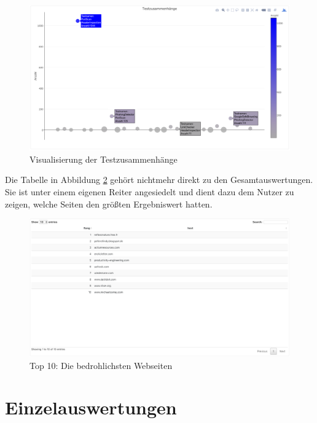 \begin{figure}[H]
  \centering
  \includegraphics[width=15cm]{images/stats/testzusammenhaenge}
  \caption{Visualisierung der Testzusammenhänge\protect\footnotemark}
  \label{fig:analyse-testzusammenhaenge}
\end{figure}

Die Tabelle in Abbildung \ref{fig:analyse-top10} gehört nichtmehr direkt zu den Gesamtauswertungen. Sie ist unter einem eigenen Reiter angesiedelt und dient dazu dem Nutzer zu zeigen, welche Seiten den größten Ergebniswert hatten.
\begin{figure}[H]
  \centering
  \includegraphics[width=15cm]{images/stats/top10}
  \caption{Top 10: Die bedrohlichsten Webseiten\protect\footnotemark}
  \label{fig:analyse-top10}
\end{figure}

\section{Einzelauswertungen}

